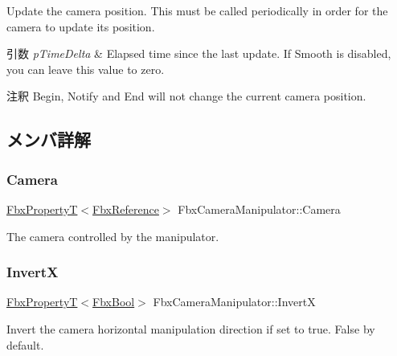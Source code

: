 Update the camera position. This must be called periodically in order for the camera to update its position. 
\begin{DoxyParams}{引数}
{\em p\+Time\+Delta} & Elapsed time since the last update. If Smooth is disabled, you can leave this value to zero. \\
\hline
\end{DoxyParams}
\begin{DoxyRemark}{注釈}
Begin, Notify and End will not change the current camera position. 
\end{DoxyRemark}


\subsection{メンバ詳解}
\mbox{\label{class_fbx_camera_manipulator_a3914094466ec766c18c0e544431e8060}} 
\subsubsection{\texorpdfstring{Camera}{Camera}}
{\footnotesize\ttfamily \hyperlink{class_fbx_property_t}{Fbx\+PropertyT}$<$\hyperlink{fbxtypes_8h_a44df6a2eec915cf27cd481e5c5e48a24}{Fbx\+Reference}$>$ Fbx\+Camera\+Manipulator\+::\+Camera}

The camera controlled by the manipulator. \mbox{\label{class_fbx_camera_manipulator_aebb2e55534a051995499d73cd1742511}} 
\subsubsection{\texorpdfstring{InvertX}{InvertX}}
{\footnotesize\ttfamily \hyperlink{class_fbx_property_t}{Fbx\+PropertyT}$<$\hyperlink{fbxtypes_8h_a92e0562b2fe33e76a242f498b362262e}{Fbx\+Bool}$>$ Fbx\+Camera\+Manipulator\+::\+InvertX}

Invert the camera horizontal manipulation direction if set to true. False by default. \mbox{\label{class_fbx_camera_manipulator_a9e9a2e653b6ef9f1d3da31110f26fec3}} 
